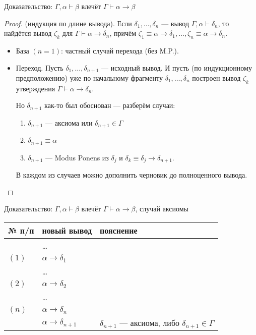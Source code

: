 \documentclass[aspectratio=169]{beamer}
\begin{document}
\begin{frame}{Доказательство: $\Gamma,\alpha\vdash\beta$ влечёт $\Gamma\vdash\alpha\rightarrow\beta$}

\begin{proof} (индукция по длине вывода). Если $\delta_1, \dots, \delta_n$ --- вывод
$\Gamma,\alpha\vdash\delta_n$, то найдётся вывод $\zeta_k$ для $\Gamma\vdash\alpha\rightarrow\delta_n$,
причём $\zeta_1 \equiv \alpha\rightarrow\delta_1, \dots, \zeta_n \equiv \alpha\rightarrow\delta_n$.

\begin{itemize}
\item База $(n=1)$: частный случай перехода (без M.P.).

\item Переход. Пусть $\delta_1, \dots, \delta_{n+1}$ --- исходный вывод. И пусть (по индукционному предположению)
уже по начальному фрагменту $\delta_1, \dots, \delta_n$ построен вывод $\zeta_k$ утверждения 
$\Gamma\vdash\alpha\rightarrow\delta_n$. 

Но $\delta_{n+1}$ как-то был обоснован --- разберём случаи:
\begin{enumerate}
\item $\delta_{n+1}$ --- аксиома или $\delta_{n+1} \in \Gamma$ %
\item $\delta_{n+1}\equiv\alpha$\pause
\item $\delta_{n+1}$ --- Modus Ponens из $\delta_j$ и 
$\delta_k \equiv \delta_j\rightarrow\delta_{n+1}$.
\end{enumerate}

В каждом из случаев можно дополнить черновик до полноценного вывода.
\end{itemize}\end{proof}

\end{frame}

\begin{frame}{Доказательство: $\Gamma,\alpha\vdash\beta$ влечёт $\Gamma\vdash\alpha\rightarrow\beta$, случай аксиомы}
\begin{tabular}{lll}
№ п/п & новый вывод & пояснение \\
\hline
& \dots\\
$(1)$ & $\alpha\rightarrow\delta_1$ \\
& \dots\\
$(2)$ & $\alpha\rightarrow\delta_2$ \\
    & \dots \\
$(n)$ & $\alpha\rightarrow\delta_n$ \\
 & \color{cyan}$\alpha\rightarrow\delta_{n+1}$ & \color{cyan}$\delta_{n+1}$ --- аксиома, либо $\delta_{n+1} \in \Gamma$\\
\end{tabular}
\end{frame}
\end{document}
